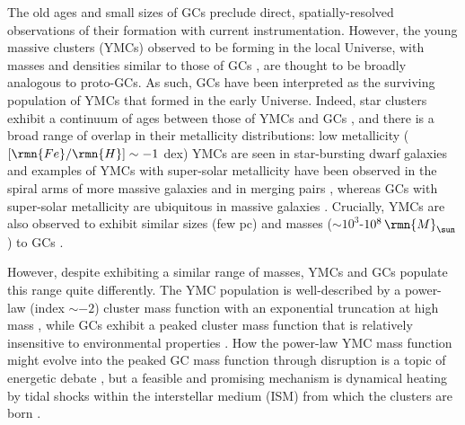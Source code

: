 \documentclass[fleqn,usenatbib]{mnras}
\newcommand\Msun{\,\rmn{M}_{\sun}}
\newcommand\FeH{\lbrack \rmn{Fe}/\rmn{H} \rbrack}
\begin{document}
The old ages and small sizes of GCs preclude direct, spatially-resolved observations of their formation with current instrumentation. However, the young massive clusters (YMCs) observed to be forming in the local Universe, with masses and densities similar to those of GCs \citep[see e.g.~reviews by][]{Portegies-Zwart_McMillan_and_Gieles_10, Longmore_et_al_14, Kruijssen_14}, are thought to be broadly analogous to proto-GCs. As such, GCs have been interpreted as the surviving population of YMCs that formed in the early Universe. Indeed, star clusters exhibit a continuum of ages between those of YMCs and GCs \citep[e.g.][]{Salaris_Weiss_and_Percival_04, Parisi_et_al_14, Beasley_et_al_15}, and there is a broad range of overlap in their metallicity distributions: low metallicity ($\FeH \sim -1$ dex) YMCs are seen in star-bursting dwarf galaxies \citep[e.g.][]{Ostlin_et_al_07} and examples of YMCs with super-solar metallicity have been observed in the spiral arms of more massive galaxies and in merging pairs \citep[e.g.][]{Gazak_et_al_14}, whereas GCs with super-solar metallicity are ubiquitous in massive galaxies \citep{Harris_and_Harris_02, Usher_et_al_12, Lamers_et_al_17}. Crucially, YMCs are also observed to exhibit similar sizes (few pc) and masses ($\sim 10^3$-$10^8 \Msun$) to GCs \citep{Maraston_et_al_04, Whitmore_et_al_10}.

However, despite exhibiting a similar range of masses, YMCs and GCs populate this range quite differently. The YMC population is well-described by a power-law (index $\sim -2$) cluster mass function with an exponential truncation at high mass \citep[e.g.][]{Larsen_09, Portegies-Zwart_McMillan_and_Gieles_10}, while GCs exhibit a peaked cluster mass function that is relatively insensitive to environmental properties \citep[e.g.~galaxy mass and galactocentric radius;][]{Jordan_et_al_07_XII,Harris_et_al_14}. How the power-law YMC mass function might evolve into the peaked GC mass function through disruption is a topic of energetic debate \citep[see][]{Fall_and_Zhang_01, Vesperini_et_al_03, Elmegreen_10, Kruijssen_15, Gieles_and_Renaud_16}, but a feasible and promising mechanism is dynamical heating by tidal shocks within the interstellar medium (ISM) from which the clusters are born \citep{Elmegreen_10, Kruijssen_15}.
\end{document}
